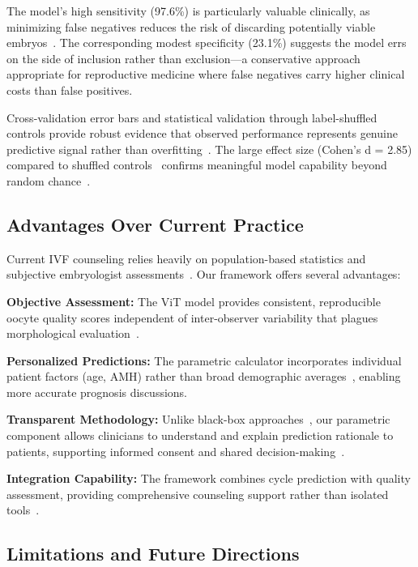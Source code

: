The model's high sensitivity (97.6\%) is particularly valuable clinically, as minimizing false negatives reduces the risk of discarding potentially viable embryos~\cite{cutting2008elective}. The corresponding modest specificity (23.1\%) suggests the model errs on the side of inclusion rather than exclusion—a conservative approach appropriate for reproductive medicine where false negatives carry higher clinical costs than false positives.

Cross-validation error bars and statistical validation through label-shuffled controls provide robust evidence that observed performance represents genuine predictive signal rather than overfitting~\cite{hastie2009elements}. The large effect size (Cohen's d = 2.85) compared to shuffled controls~\cite{cohen1988statistical} confirms meaningful model capability beyond random chance~\cite{mann1947test}.

\subsection{Advantages Over Current Practice}

Current IVF counseling relies heavily on population-based statistics and subjective embryologist assessments~\cite{asrm2017embryo,racowsky2010standardization}. Our framework offers several advantages:

\textbf{Objective Assessment:} The ViT model provides consistent, reproducible oocyte quality scores independent of inter-observer variability that plagues morphological evaluation~\cite{paternot2009observer,paternot2011multicentre}.

\textbf{Personalized Predictions:} The parametric calculator incorporates individual patient factors (age, AMH) rather than broad demographic averages~\cite{gameiro2023understanding}, enabling more accurate prognosis discussions.

\textbf{Transparent Methodology:} Unlike black-box approaches~\cite{rudin2019stop}, our parametric component allows clinicians to understand and explain prediction rationale to patients, supporting informed consent and shared decision-making~\cite{beauchamp2019principles}.

\textbf{Integration Capability:} The framework combines cycle prediction with quality assessment, providing comprehensive counseling support rather than isolated tools~\cite{asrm2021counselors}.

\subsection{Limitations and Future Directions}

